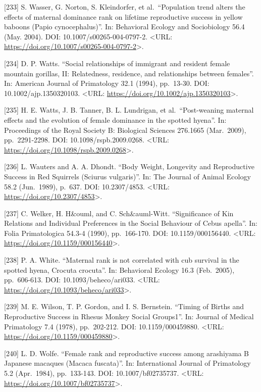 \documentclass[
]{article}
\begin{document}
{[}233{]} S. Wasser, G. Norton, S. Kleindorfer, et al.~``Population
trend alters the effects of maternal dominance rank on lifetime
reproductive success in yellow baboons (Papio cynocephalus)''. In:
Behavioral Ecology and Sociobiology 56.4 (May. 2004). DOI:
10.1007/s00265-004-0797-2. \textless URL:
\url{https://doi.org/10.1007/s00265-004-0797-2}\textgreater.

{[}234{]} D. P. Watts. ``Social relationships of immigrant and resident
female mountain gorillas, II: Relatedness, residence, and relationships
between females''. In: American Journal of Primatology 32.1 (1994),
pp.~13-30. DOI: 10.1002/ajp.1350320103. \textless URL:
\url{https://doi.org/10.1002/ajp.1350320103}\textgreater.

{[}235{]} H. E. Watts, J. B. Tanner, B. L. Lundrigan, et
al.~``Post-weaning maternal effects and the evolution of female
dominance in the spotted hyena''. In: Proceedings of the Royal Society
B: Biological Sciences 276.1665 (Mar.~2009), pp.~2291-2298. DOI:
10.1098/rspb.2009.0268. \textless URL:
\url{https://doi.org/10.1098/rspb.2009.0268}\textgreater.

{[}236{]} L. Wauters and A. A. Dhondt. ``Body Weight, Longevity and
Reproductive Success in Red Squirrels (Sciurus vulgaris)''. In: The
Journal of Animal Ecology 58.2 (Jun.~1989), p.~637. DOI: 10.2307/4853.
\textless URL: \url{https://doi.org/10.2307/4853}\textgreater.

{[}237{]} C. Welker, H. H\&ouml, and C. Sch\&auml-Witt. ``Significance
of Kin Relations and Individual Preferences in the Social Behaviour of
Cebus apella''. In: Folia Primatologica 54.3-4 (1990), pp.~166-170. DOI:
10.1159/000156440. \textless URL:
\url{https://doi.org/10.1159/000156440}\textgreater.

{[}238{]} P. A. White. ``Maternal rank is not correlated with cub
survival in the spotted hyena, Crocuta crocuta''. In: Behavioral Ecology
16.3 (Feb.~2005), pp.~606-613. DOI: 10.1093/beheco/ari033.
\textless URL: \url{https://doi.org/10.1093/beheco/ari033}\textgreater.

{[}239{]} M. E. Wilson, T. P. Gordon, and I. S. Bernstein. ``Timing of
Births and Reproductive Success in Rhesus Monkey Social Groups1''. In:
Journal of Medical Primatology 7.4 (1978), pp.~202-212. DOI:
10.1159/000459880. \textless URL:
\url{https://doi.org/10.1159/000459880}\textgreater.

{[}240{]} L. D. Wolfe. ``Female rank and reproductive success among
arashiyama B Japanese macaques (Macaca fuscata)''. In: International
Journal of Primatology 5.2 (Apr.~1984), pp.~133-143. DOI:
10.1007/bf02735737. \textless URL:
\url{https://doi.org/10.1007/bf02735737}\textgreater.
\end{document}
